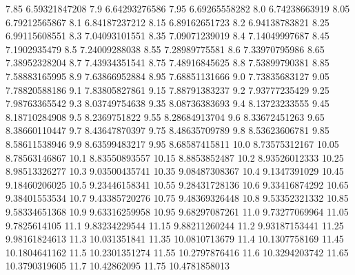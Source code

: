            7.85    6.59321847208
            7.9    6.64293276586
           7.95    6.69265558282
            8.0    6.74238663919
           8.05    6.79212565867
            8.1    6.84187237212
           8.15    6.89162651723
            8.2    6.94138783821
           8.25    6.99115608551
            8.3    7.04093101551
           8.35    7.09071239019
            8.4    7.14049997687
           8.45     7.1902935479
            8.5    7.24009288038
           8.55    7.28989775581
            8.6    7.33970795986
           8.65    7.38952328204
            8.7    7.43934351541
           8.75    7.48916845625
            8.8    7.53899790381
           8.85    7.58883165995
            8.9    7.63866952884
           8.95    7.68851131666
            9.0    7.73835683127
           9.05    7.78820588186
            9.1    7.83805827861
           9.15    7.88791383237
            9.2    7.93777235429
           9.25    7.98763365542
            9.3    8.03749754638
           9.35    8.08736383693
            9.4    8.13723233555
           9.45    8.18710284908
            9.5     8.2369751822
           9.55    8.28684913704
            9.6    8.33672451263
           9.65    8.38660110447
            9.7    8.43647870397
           9.75    8.48635709789
            9.8    8.53623606781
           9.85    8.58611538946
            9.9    8.63599483217
           9.95    8.68587415811
           10.0    8.73575312167
          10.05    8.78563146867
           10.1    8.83550893557
          10.15     8.8853852487
           10.2    8.93526012333
          10.25    8.98513326277
           10.3    9.03500435741
          10.35    9.08487308367
           10.4     9.1347391029
          10.45    9.18460206025
           10.5    9.23446158341
          10.55    9.28431728136
           10.6    9.33416874292
          10.65    9.38401553534
           10.7    9.43385720276
          10.75    9.48369326448
           10.8    9.53352321332
          10.85    9.58334651368
           10.9    9.63316259958
          10.95    9.68297087261
           11.0    9.73277069964
          11.05     9.7825614105
           11.1    9.83234229544
          11.15    9.88211260244
           11.2    9.93187153441
          11.25    9.98161824613
           11.3     10.031351841
          11.35    10.0810713679
           11.4    10.1307758169
          11.45    10.1804641162
           11.5    10.2301351274
          11.55    10.2797876416
           11.6    10.3294203742
          11.65    10.3790319605
           11.7      10.42862095
          11.75    10.4781858013

